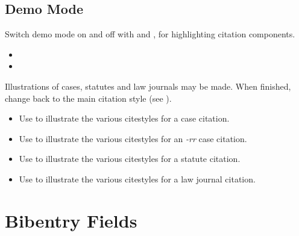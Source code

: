 \subsection{Demo Mode}%
\p Switch demo mode on and off with  and , for highlighting citation components.

\lcsetdemoon
\begin{itemize}
\item {}
\item {}
\end{itemize}
\lcsetdemooff

\p {}Illustrations of cases, statutes and law journals may be made. When finished, change back to the main citation style (see ).

\begin{itemize}
\item Use  to illustrate the various citestyles for a case citation.
\end{itemize}


\begin{itemize}
\item Use  to illustrate the various citestyles for an \textit{-rr} case citation.
\end{itemize}



\begin{itemize}
\item Use  to illustrate the various citestyles for a statute citation.
\end{itemize}




\begin{itemize}
\item Use  to illustrate the various citestyles for a law journal citation.
\end{itemize}


\lcsetstylemcgill%


\section{Bibentry Fields}
